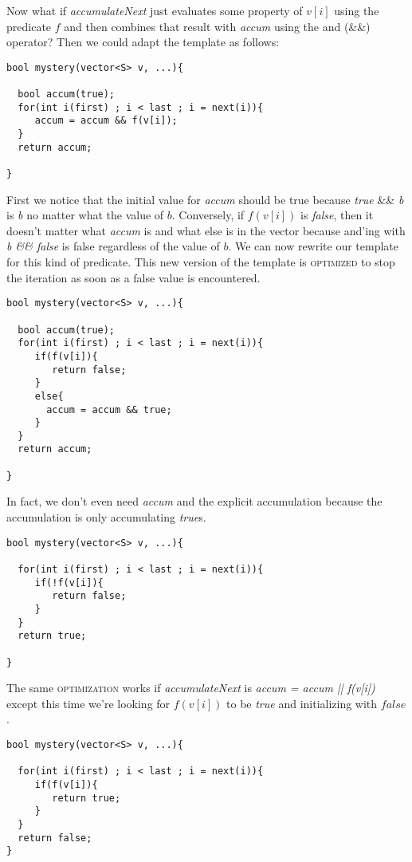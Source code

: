 \documentclass[]{tufte-handout}
\begin{document}
Now what if \textit{accumulateNext} just evaluates some property of $v[i]$ using the predicate $f$ and then combines that result with \textit{accum} using the and (\&\&) operator? Then we could adapt the template as follows:
\begin{verbatim}
bool mystery(vector<S> v, ...){
  
  bool accum(true);
  for(int i(first) ; i < last ; i = next(i)){
     accum = accum && f(v[i]);  
  } 
  return accum;

} 
\end{verbatim}
First we notice that the initial value for \textit{accum} should be true because \textit{true} \&\& \textit{b} is \textit{b} no matter what the value of $b$. Conversely, if $f(v[i])$ is \textit{false}, then it doesn't matter what \textit{accum} is and what else is in the vector because and'ing with \textit{b \&\& false} is false regardless of the value of $b$.  We can now rewrite our template for this kind of predicate. This new version of the template is \textsc{optimized} to stop the iteration as soon as a false value is encountered.
\begin{verbatim}
bool mystery(vector<S> v, ...){
  
  bool accum(true);
  for(int i(first) ; i < last ; i = next(i)){
     if(f(v[i]){
        return false;
     } 
     else{
       accum = accum && true;
     }
  } 
  return accum;

} 
\end{verbatim}
In fact, we don't even need \textit{accum} and the explicit accumulation because the accumulation is only accumulating \textit{true}s.
\begin{verbatim}
bool mystery(vector<S> v, ...){
  
  for(int i(first) ; i < last ; i = next(i)){
     if(!f(v[i]){
        return false;
     }  
  } 
  return true;

} 
\end{verbatim}

The same \textsc{optimization} works if \textit{accumulateNext} is \textit{accum = accum || f(v[i])} except this time we're looking for $f(v[i])$ to be \textit{true} and initializing with $false$.
\begin{verbatim}
bool mystery(vector<S> v, ...){
  
  for(int i(first) ; i < last ; i = next(i)){
     if(f(v[i]){
        return true;
     }  
  } 
  return false;
} 
\end{verbatim}
\end{document}

